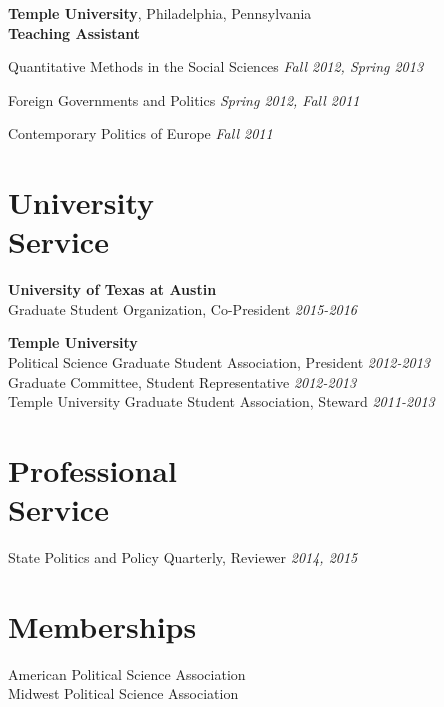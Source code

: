 \documentclass[margin,line]{res}
\newenvironment{list2}{
    \begin{list}{--}{%
        \setlength{\itemsep}{0in}
        \setlength{\parsep}{0in} \setlength{\parskip}{0in}
        \setlength{\topsep}{0in} \setlength{\partopsep}{0in}
        \setlength{\leftmargin}{0.2in}}}{\end{list}}
\begin{document}
\begin{resume}
{\bf Temple University}, Philadelphia, Pennsylvania  \\
{\bf Teaching Assistant}

\begin{list2}
	\item Quantitative Methods in the Social Sciences \hfill {\em Fall 2012, Spring 2013}
	\item Foreign Governments and Politics \hfill {\em Spring 2012, Fall 2011}
	\item Contemporary Politics of Europe \hfill {\em Fall 2011}
\end{list2}




\section{\sc University \\Service}
{\bf University of Texas at Austin} \\
Graduate Student Organization, Co-President \hfill     {\em 2015-2016} %

{\bf Temple University}\\
Political Science Graduate Student Association, President \hfill {\em 2012-2013} \\
Graduate Committee, Student Representative \hfill {\em 2012-2013} \\
Temple University Graduate Student Association, Steward \hfill {\em 2011-2013} %

\section{\sc Professional \\Service}
State Politics and Policy Quarterly, Reviewer \hfill    {\em 2014, 2015} \\

\section{\sc Memberships}
American Political Science Association \\
Midwest Political Science Association \\



\end{resume}
\end{document}
